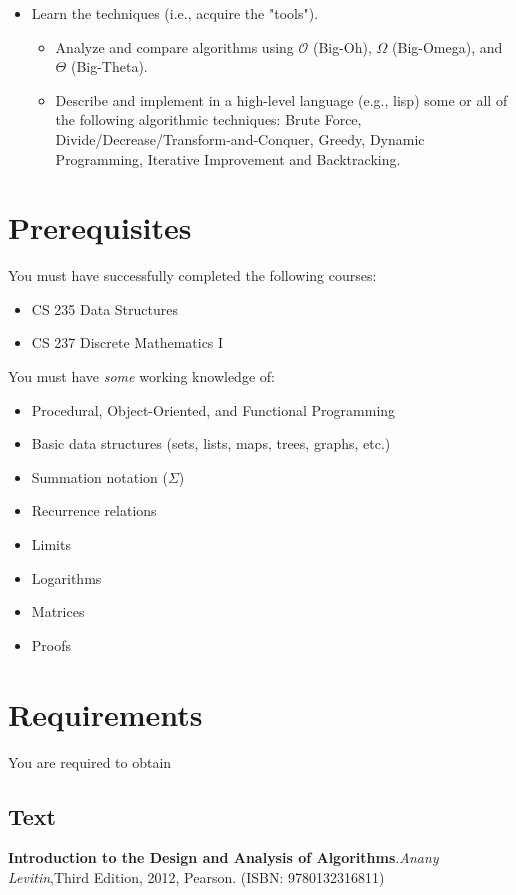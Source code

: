 \documentclass[12pt]{amsart}
\begin{document}
\begin{itemize}
\item Learn the techniques (i.e., acquire the "tools").
	\begin{itemize}
          \item Analyze and compare algorithms using $\mathcal{O}$ (Big-Oh), $\Omega$ (Big-Omega), and
              $\Theta$ (Big-Theta).
          \item Describe and implement in a high-level language (e.g., lisp)
              some or all of the following algorithmic techniques: Brute
              Force, Divide/Decrease/Transform-and-Conquer, Greedy, Dynamic
              Programming, Iterative Improvement and Backtracking.
      	\end{itemize}
\end{itemize}
\section{Prerequisites}

  You must have successfully completed the following courses:
\begin{itemize}
    \item CS 235 Data Structures
    \item CS 237 Discrete Mathematics I
\end{itemize}
  You must have \textit{some} working knowledge of:
\begin{itemize}
     \item Procedural, Object-Oriented, and Functional Programming
     \item Basic data structures (sets, lists, maps, trees, graphs, etc.)
     \item Summation notation ($\Sigma$)
     \item Recurrence relations
     \item Limits
     \item Logarithms
     \item Matrices
     \item Proofs
\end{itemize}

\section{Requirements}
You are required to obtain
\subsection{Text} 
	\textbf{Introduction to the Design and Analysis of Algorithms}.\textit{Anany Levitin},Third Edition, 2012, Pearson. (ISBN: 9780132316811)
\end{document}
